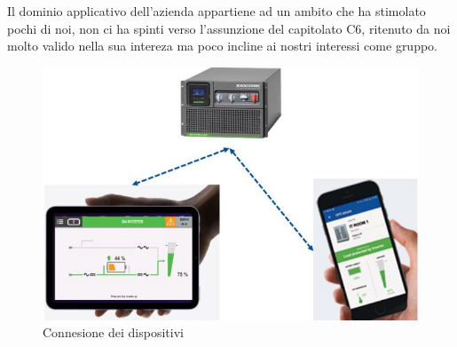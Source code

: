 \documentclass[11pt]{article}
\begin{document}
    Il dominio applicativo dell'azienda appartiene ad un ambito che ha stimolato pochi di noi, non ci ha spinti verso l'assunzione del capitolato C6, ritenuto da noi molto valido nella sua intereza ma poco incline ai nostri interessi come gruppo.
    
    \begin{figure}[h!]
        \centering
        \includegraphics[scale=0.4]{Res/SocomecConnection.png}
        \caption{Connesione dei dispositivi}
        \label{socom}
    \end{figure}
\end{document}
